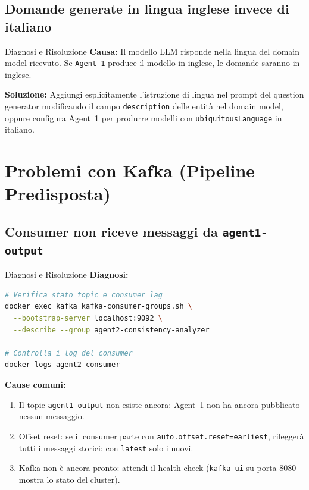 \documentclass[12pt,a4paper]{report}
\begin{document}
\subsection{Domande generate in lingua inglese invece di italiano}

\begin{technicalbox}{Diagnosi e Risoluzione}
\textbf{Causa:} Il modello LLM risponde nella lingua del domain model ricevuto.
Se \texttt{Agent 1} produce il modello in inglese, le domande saranno in inglese.

\textbf{Soluzione:} Aggiungi esplicitamente l'istruzione di lingua nel prompt
del question generator modificando il campo \texttt{description} delle entità
nel domain model, oppure configura Agent~1 per produrre modelli con
\texttt{ubiquitousLanguage} in italiano.
\end{technicalbox}
\section{Problemi con Kafka (Pipeline Predisposta)}

\subsection{Consumer non riceve messaggi da \texttt{agent1-output}}

\begin{technicalbox}{Diagnosi e Risoluzione}
\textbf{Diagnosi:}
\begin{lstlisting}[language=bash]
# Verifica stato topic e consumer lag
docker exec kafka kafka-consumer-groups.sh \
  --bootstrap-server localhost:9092 \
  --describe --group agent2-consistency-analyzer

# Controlla i log del consumer
docker logs agent2-consumer
\end{lstlisting}

\textbf{Cause comuni:}
\begin{enumerate}
  \item Il topic \texttt{agent1-output} non esiste ancora: Agent~1 non ha ancora
        pubblicato nessun messaggio.
  \item Offset reset: se il consumer parte con \texttt{auto.offset.reset=earliest},
        rileggerà tutti i messaggi storici; con \texttt{latest} solo i nuovi.
  \item Kafka non è ancora pronto: attendi il health check
        (\texttt{kafka-ui} su porta 8080 mostra lo stato del cluster).
\end{enumerate}
\end{technicalbox}
\end{document}
